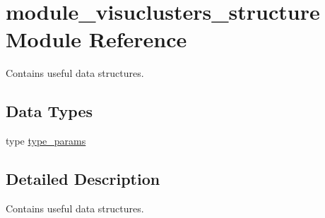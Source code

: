 \hypertarget{namespacemodule__visuclusters__structure}{}\section{module\+\_\+visuclusters\+\_\+structure Module Reference}
\label{namespacemodule__visuclusters__structure}


Contains useful data structures.  


\subsection*{Data Types}
\begin{DoxyCompactItemize}
\item 
type \hyperlink{structmodule__visuclusters__structure_1_1type__params}{type\+\_\+params}
\end{DoxyCompactItemize}


\subsection{Detailed Description}
Contains useful data structures. 